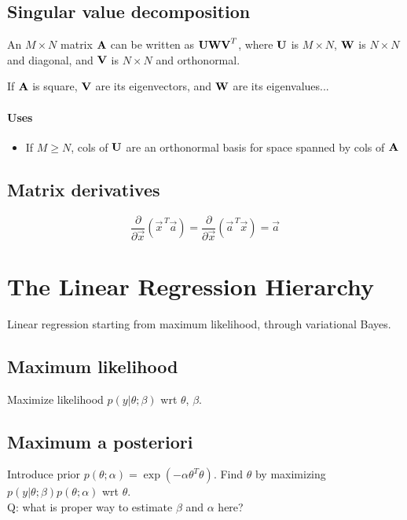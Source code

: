 \documentclass[11pt]{article}
\begin{document}
\begin{appendices}
\subsection{Singular value decomposition}
\label{subsec:SVD}
An $M \times N$ matrix $\textbf{A}$ can be written as $\textbf{U}\textbf{W}\textbf{V}^T$, where
$\textbf{U}$ is $M \times N$, $\textbf{W}$ is $N \times N$ and diagonal, and $\textbf{V}$ is
$N \times N$ and orthonormal.

If $\textbf{A}$ is square, $\textbf{V}$ are its eigenvectors, and $\textbf{W}$ are its
eigenvalues...

\paragraph{Uses}
\begin{itemize}
  \item If $M \geq N$, cols of $\textbf{U}$ are an orthonormal basis for space spanned by
  cols of $\textbf{A}$
\end{itemize}

\TODOFIN{}

\subsection{Matrix derivatives}

\begin{equation}
  \frac{\partial}{\partial \vec{x}} \left( \vec{x}^{\, T} \vec{a} \right) =
  \frac{\partial}{\partial \vec{x}} \left( \vec{a}^{\, T} \vec{x} \right) =
  \vec{a} 
\end{equation}




\section{The Linear Regression Hierarchy}
Linear regression starting from maximum likelihood, through variational Bayes.
\subsection{Maximum likelihood}
Maximize likelihood $p(y | \theta ; \beta)$ wrt $\theta$, $\beta$.

\subsection{Maximum a posteriori}
Introduce prior $p(\theta ; \alpha) = \exp(-\alpha \theta^T \theta)$. Find $\theta$ by
maximizing $p(y | \theta ; \beta) p(\theta ; \alpha)$ wrt $\theta$.
\\
Q: what is proper way to estimate $\beta$ and $\alpha$ here?


\end{appendices}
\end{document}
